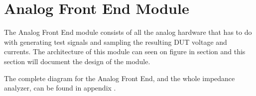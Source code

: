 \section{Analog Front End Module} \label{sec:AnalogFrontEndModule}
The Analog Front End module consists of all the analog hardware that has to do with generating test signals and sampling the resulting DUT voltage and currents. The architecture of this module can seen on figure  in section  and this section will document the design of the module.

The complete diagram for the Analog Front End, and the whole impedance analyzer, can be found in appendix . %
